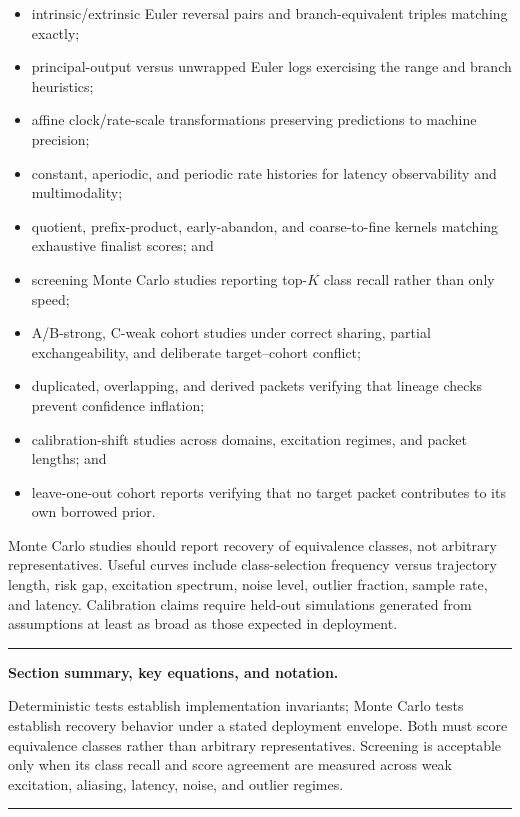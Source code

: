 \documentclass[11pt]{article}
\newenvironment{sectionrecap}
{\par\medskip\begingroup\small\noindent\rule{\linewidth}{0.4pt}\par
\smallskip\noindent\textbf{Section summary, key equations, and notation.}\par\smallskip}
{\par\smallskip\noindent\rule{\linewidth}{0.4pt}\par\endgroup\medskip}
\begin{document}
\begin{itemize}[nosep]
    \item intrinsic/extrinsic Euler reversal pairs and branch-equivalent triples matching exactly;
    \item principal-output versus unwrapped Euler logs exercising the range and branch heuristics;
    \item affine clock/rate-scale transformations preserving predictions to machine precision;
    \item constant, aperiodic, and periodic rate histories for latency observability and multimodality;
    \item quotient, prefix-product, early-abandon, and coarse-to-fine kernels matching exhaustive finalist scores; and
    \item screening Monte Carlo studies reporting top-$K$ class recall rather than only speed;
    \item A/B-strong, C-weak cohort studies under correct sharing, partial exchangeability,
    and deliberate target--cohort conflict;
    \item duplicated, overlapping, and derived packets verifying that lineage checks prevent
    confidence inflation;
    \item calibration-shift studies across domains, excitation regimes, and packet lengths;
    and
    \item leave-one-out cohort reports verifying that no target packet contributes to its
    own borrowed prior.
    \end{itemize}

    Monte Carlo studies should report recovery of equivalence classes, not arbitrary
    representatives. Useful curves include class-selection frequency versus trajectory
    length, risk gap, excitation spectrum, noise level, outlier fraction, sample rate, and
    latency. Calibration claims require held-out simulations generated from assumptions at
    least as broad as those expected in deployment.

    \begin{sectionrecap}
        Deterministic tests establish implementation invariants; Monte Carlo tests establish
        recovery behavior under a stated deployment envelope. Both must score equivalence
        classes rather than arbitrary representatives. Screening is acceptable only when its
        class recall and score agreement are measured across weak excitation, aliasing,
        latency, noise, and outlier regimes.
    \end{sectionrecap}
\end{document}
